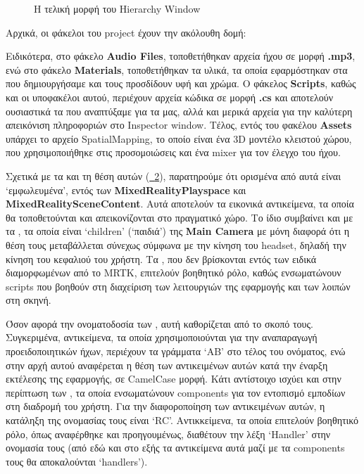 \begin{figure}[!hb]
\begin{subfigure}{0.5\textwidth}
        \caption{}\label{fig:developFinalHierarchyWindowTwo}
    \end{subfigure}%
    \caption{Η τελική μορφή του Hierarchy Window}\label{fig:developFinalHierarchyWindow}
\end{figure}

Αρχικά, οι φάκελοι του project έχουν την ακόλουθη δομή:
\\

Ειδικότερα, στο φάκελο \textbf{Audio Files}, τοποθετήθηκαν αρχεία ήχου σε μορφή \textbf{.mp3}, ενώ στο φάκελο \textbf{Materials}, τοποθετήθηκαν τα υλικά, τα οποία εφαρμόστηκαν στα  που δημιουργήσαμε και τους προσδίδουν υφή και χρώμα. Ο φάκελος \textbf{Scripts}, καθώς και οι υποφακέλοι αυτού, περιέχουν αρχεία κώδικα σε μορφή \textbf{.cs} και αποτελούν ουσιαστικά τα  που αναπτύξαμε για τα  μας, αλλά και μερικά αρχεία για την καλύτερη απεικόνιση πληροφοριών στο Inspector window. Τέλος, εντός του φακέλου \textbf{Assets} υπάρχει το αρχείο SpatialMapping, το οποίο είναι ένα 3D μοντέλο κλειστού χώρου, που χρησιμοποιήθηκε στις προσομοιώσεις και ένα mixer για τον έλεγχο του ήχου.

Σχετικά με τα  και τη θέση αυτών (\hyperref[fig:developFinalHierarchyWindow]{\schema~\ref*{fig:developFinalHierarchyWindow}}), παρατηρούμε ότι ορισμένα από αυτά είναι `εμφωλευμένα', εντός των  \textbf{MixedRealityPlayspace} και \textbf{MixedRealitySceneContent}. Αυτά αποτελούν τα εικονικά αντικείμενα, τα οποία θα τοποθετούνται και απεικονίζονται στο πραγματικό χώρο. Το ίδιο συμβαίνει και με τα , τα οποία είναι `children' (`παιδιά') της \textbf{Main Camera} με μόνη διαφορά ότι η θέση τους μεταβάλλεται σύνεχως σύμφωνα με την κίνηση του headset, δηλαδή την κίνηση του κεφαλιού του χρήστη. Τα , που δεν βρίσκονται εντός των ειδικά διαμορφωμένων  από το MRTK, επιτελούν βοηθητικό ρόλο, καθώς ενσωματώνουν scripts που βοηθούν στη διαχείριση των λειτουργιών της εφαρμογής και των λοιπών  στη σκηνή.

Όσον αφορά την ονοματοδοσία των , αυτή καθορίζεται από το σκοπό τους. Συγκεριμένα, αντικείμενα, τα οποία χρησιμοποιούνται για την αναπαραγωγή προειδοποιητικών ήχων, περιέχουν τα γράμματα `AB' στο τέλος του ονόματος, ενώ στην αρχή αυτού αναφέρεται η θέση των αντικειμένων αυτών κατά την έναρξη εκτέλεσης της εφαρμογής, σε CamelCase μορφή. Κάτι αντίστοιχο ισχύει και στην περίπτωση των , τα οποία ενσωματώνουν components για τον εντοπισμό εμποδίων στη διαδρομή του χρήστη. Για την διαφοροποίηση των αντικειμένων αυτών, η κατάληξη της ονομασίας τους είναι `RC'. Αντικκείμενα, τα οποία επιτελούν βοηθητικό ρόλο, όπως αναφέρθηκε και προηγουμένως, διαθέτουν την λέξη `Handler' στην ονομασία τους (από εδώ και στο εξής τα αντικείμενα αυτά μαζί με τα components τους θα αποκαλούνται `handlers').

